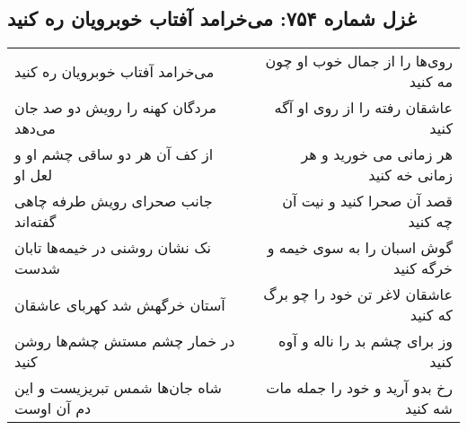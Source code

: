 \begin{center}
\section*{غزل شماره ۷۵۴: می‌خرامد آفتاب خوبرویان ره کنید}
\label{sec:0754}
\begin{longtable}{l p{0.5cm} r}
می‌خرامد آفتاب خوبرویان ره کنید
&&
روی‌ها را از جمال خوب او چون مه کنید
\\
مردگان کهنه را رویش دو صد جان می‌دهد
&&
عاشقان رفته را از روی او آگه کنید
\\
از کف آن هر دو ساقی چشم او و لعل او
&&
هر زمانی می خورید و هر زمانی خه کنید
\\
جانب صحرای رویش طرفه چاهی گفته‌اند
&&
قصد آن صحرا کنید و نیت آن چه کنید
\\
نک نشان روشنی در خیمه‌ها تابان شدست
&&
گوش اسبان را به سوی خیمه و خرگه کنید
\\
آستان خرگهش شد کهربای عاشقان
&&
عاشقان لاغر تن خود را چو برگ که کنید
\\
در خمار چشم مستش چشم‌ها روشن کنید
&&
وز برای چشم بد را ناله و آوه کنید
\\
شاه جان‌ها شمس تبریزیست و این دم آن اوست
&&
رخ بدو آرید و خود را جمله مات شه کنید
\\
\end{longtable}
\end{center}
